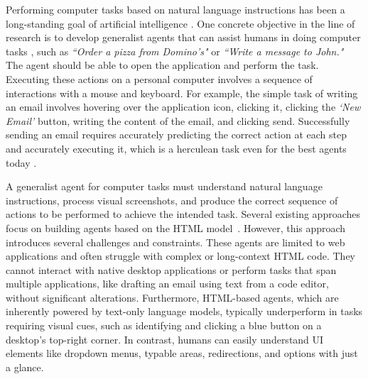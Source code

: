 Performing computer tasks based on natural language instructions has been a long-standing goal of artificial intelligence \cite{wang2023survey}. One concrete objective in the line of research is to develop generalist agents that can assist humans in doing computer tasks \cite{lecun2022path}, such as \textit{``Order a pizza from Domino's"} or \textit{``Write a message to John."} The agent should be able to open the application and perform the task. Executing these actions on a personal computer involves a sequence of interactions with a mouse and keyboard. For example, the simple task of writing an email involves hovering over the application icon, clicking it, clicking the \textit{`New Email'} button, writing the content of the email, and clicking send. Successfully sending an email requires accurately predicting the correct action at each step and accurately executing it, which is a herculean task even for the best agents today \cite{gur2018learning}. %

A generalist agent for computer tasks must understand natural language instructions, process visual screenshots, and produce the correct sequence of actions to be performed to achieve the intended task. %
Several existing approaches focus on building agents based on the HTML model~\cite{shi2017world,deng2023mind2web,zhou2023webarena}. However, this approach introduces several challenges and constraints. These agents are limited to web applications and often struggle with complex or long-context HTML code. They cannot interact with native desktop applications or perform tasks that span multiple applications, like drafting an email using text from a code editor, without significant alterations. Furthermore, HTML-based agents, which are inherently powered by text-only language models, typically underperform in tasks requiring visual cues, such as identifying and clicking a blue button on a desktop's top-right corner. In contrast, humans can easily understand UI elements like dropdown menus, typable areas, redirections, and options with just a glance.

